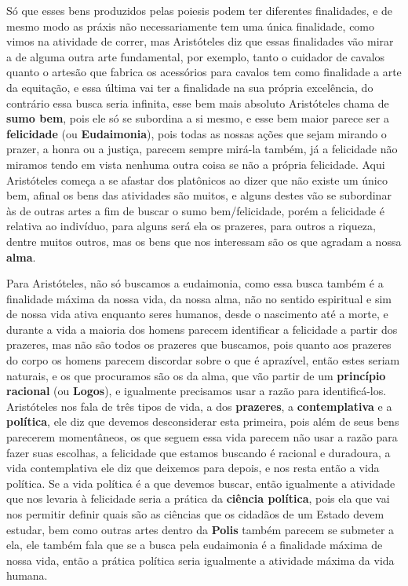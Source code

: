 \documentclass[a4paper,oneside,12pt]{article}
\begin{document}
Só que esses bens produzidos pelas poiesis podem ter diferentes finalidades, e de mesmo modo as práxis não necessariamente tem uma única finalidade, como vimos na atividade de correr, mas Aristóteles diz que essas finalidades vão mirar a de alguma outra arte fundamental, por exemplo, tanto o cuidador de cavalos quanto o artesão que fabrica os acessórios para cavalos tem como finalidade a arte da equitação, e essa última vai ter a finalidade na sua própria excelência, do contrário essa busca seria infinita, esse bem mais absoluto Aristóteles chama de \textbf{sumo bem}, pois ele só se subordina a si mesmo, e esse bem maior parece ser a \textbf{felicidade} (ou \textbf{Eudaimonia}), pois todas as nossas ações que sejam mirando o prazer, a honra ou a justiça, parecem sempre mirá-la também, já a felicidade não miramos tendo em vista nenhuma outra coisa se não a própria felicidade. Aqui Aristóteles começa a se afastar dos platônicos ao dizer que não existe um único bem, afinal os bens das atividades são muitos, e alguns destes vão se subordinar às de outras artes a fim de buscar o sumo bem/felicidade, porém a felicidade é relativa ao indivíduo, para alguns será ela os prazeres, para outros a riqueza, dentre muitos outros, mas os bens que nos interessam são os que agradam a nossa \textbf{alma}.

Para Aristóteles, não só buscamos a eudaimonia, como essa busca também é a finalidade máxima da nossa vida, da nossa alma, não no sentido espiritual e sim de nossa vida ativa enquanto seres humanos, desde o nascimento até a morte, e durante a vida a maioria dos homens parecem identificar a felicidade a partir dos prazeres, mas não são todos os prazeres que buscamos, pois quanto aos prazeres do corpo os homens parecem discordar sobre o que é aprazível, então estes seriam naturais, e os que procuramos são os da alma, que vão partir de um \textbf{princípio racional} (ou \textbf{Logos}), e igualmente precisamos usar a razão para identificá-los. Aristóteles nos fala de três tipos de vida, a dos \textbf{prazeres}, a \textbf{contemplativa} e a \textbf{política}, ele diz que devemos desconsiderar esta primeira, pois além de seus bens parecerem momentâneos, os que seguem essa vida parecem não usar a razão para fazer suas escolhas, a felicidade que estamos buscando é racional e duradoura, a vida contemplativa ele diz que deixemos para depois, e nos resta então a vida política. Se a vida política é a que devemos buscar, então igualmente a atividade que nos levaria à felicidade seria a prática da \textbf{ciência política}, pois ela que vai nos permitir definir quais são as ciências que os cidadãos de um Estado devem estudar, bem como outras artes dentro da \textbf{Polis} também parecem se submeter a ela, ele também fala que se a busca pela eudaimonia é a finalidade máxima de nossa vida, então a prática política seria igualmente a atividade máxima da vida humana.
\end{document}
